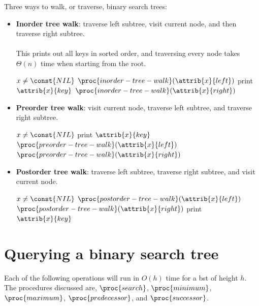 \documentclass[12pt]{article}
\begin{document}
Three ways to walk, or traverse, binary search trees:
\begin{itemize}
    \item[]\textbf{Inorder tree walk}: traverse left subtree, visit current node, and then traverse right subtree. 
    \\ \\
    This prints out all keys in sorted order, and traversing every node takes $\Theta{(n)}$ time when starting from the root.
    \begin{codebox}
    \li \If $x \neq \const{NIL}$
    \li \Then
            $\proc{inorder-tree-walk}(\attrib{x}{left})$
    \li     print $\attrib{x}{key}$
    \li     $\proc{inorder-tree-walk}(\attrib{x}{right})$
    \end{codebox}

    \item[]\textbf{Preorder tree walk}: visit current node, traverse left subtree, and traverse right subtree.
    
    \begin{codebox}
    \li \If $x \neq \const{NIL}$
    \li \Then
            print $\attrib{x}{key}$
    \li     $\proc{preorder-tree-walk}(\attrib{x}{left})$
    \li     $\proc{preorder-tree-walk}(\attrib{x}{right})$
    \end{codebox}
    
    \item[]\textbf{Postorder tree walk}: traverse left subtree, traverse
        right subtree, and visit current node.
    
    \begin{codebox}
    \li \If $x \neq \const{NIL}$
    \li \Then
            $\proc{postorder-tree-walk}(\attrib{x}{left})$
    \li     $\proc{postorder-tree-walk}(\attrib{x}{right})$
    \li     print $\attrib{x}{key}$
    \end{codebox}
    
\end{itemize}

\section*{Querying a binary search tree}
Each of the following operations will run in $O(h)$ time for a bst of height $h$. The procedures discussed are, $\proc{search}$, $\proc{minimum}$, $\proc{maximum}$, $\proc{predecessor}$, and $\proc{successor}$.
\end{document}
